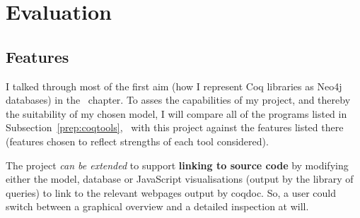 \chapter{Evaluation}\label{chapter:evaluation}


%

\section{Features}\label{eval:compare}

I talked through most of the first aim (how I represent Coq libraries as Neo4j
databases) in the~ chapter. To asses the capabilities of my
project, and thereby the suitability of my chosen model, I will compare all of
the programs listed in Subsection~\ref{prep:coqtools},~
with this project against the features listed there (features chosen to reflect
strengths of each tool considered).

The project \emph{can be extended} to support \textbf{linking to source code}
by modifying either the model, database or JavaScript visualisations (output
by the library of queries) to link to the relevant webpages output by coqdoc.
So, a user could switch between a graphical overview and a detailed inspection
at will.


